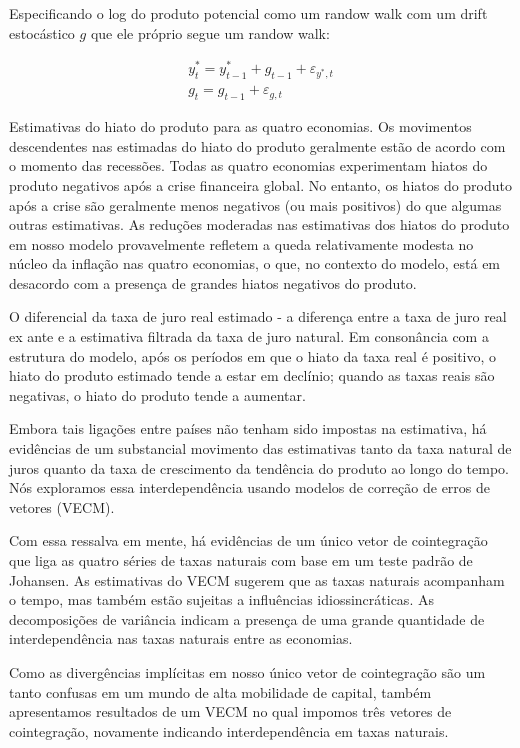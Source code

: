 \documentclass[11pt,oneside,a4paper]{article}
\begin{document}
Especificando o log do produto potencial como um randow walk com um drift estocástico $g$ que ele próprio segue um randow walk:

\begin{eqnarray}
    y^{*}_t = y^{*}_{t-1} + g_{t-1} + \varepsilon_{y^{*},t} \\
    g_t = g_{t-1} + \varepsilon_{g,t}
\end{eqnarray}

Estimativas do hiato do produto para as quatro economias. Os movimentos descendentes nas estimadas do hiato do produto geralmente estão de acordo com o momento das recessões. Todas as quatro economias experimentam hiatos do produto negativos após a crise financeira global. No entanto, os hiatos do produto após a crise são geralmente menos negativos (ou mais positivos) do que algumas outras estimativas. As reduções moderadas nas estimativas dos hiatos do produto em nosso modelo provavelmente refletem a queda relativamente modesta no núcleo da inflação nas quatro economias, o que, no contexto do modelo, está em desacordo com a presença de grandes hiatos negativos do produto.

O diferencial da taxa de juro real estimado - a diferença entre a taxa de juro real ex ante e a estimativa filtrada da taxa de juro natural. Em consonância com a estrutura do modelo, após os períodos em que o hiato da taxa real é positivo, o hiato do produto estimado tende a estar em declínio; quando as taxas reais são negativas, o hiato do produto tende a aumentar.

Embora tais ligações entre países não tenham sido impostas na estimativa, há evidências de um substancial movimento das estimativas tanto da taxa natural de juros quanto da taxa de crescimento da tendência do produto ao longo do tempo. Nós exploramos essa interdependência usando modelos de correção de erros de vetores (VECM).

Com essa ressalva em mente, há evidências de um único vetor de cointegração que liga as quatro séries de taxas naturais com base em um teste padrão de Johansen. As estimativas do VECM sugerem que as taxas naturais acompanham o tempo, mas também estão sujeitas a influências idiossincráticas. As decomposições de variância indicam a presença de uma grande quantidade
de interdependência nas taxas naturais entre as economias.

Como as divergências implícitas em nosso único vetor de cointegração são um tanto confusas em um mundo de alta mobilidade de capital, também apresentamos resultados de um VECM no qual impomos três vetores de cointegração, novamente indicando interdependência em taxas naturais.
\end{document}
